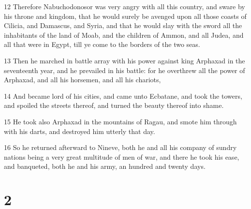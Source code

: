 \par 12 Therefore Nabuchodonosor was very angry with all this country, and sware by his throne and kingdom, that he would surely be avenged upon all those coasts of Cilicia, and Damascus, and Syria, and that he would slay with the sword all the inhabitants of the land of Moab, and the children of Ammon, and all Judea, and all that were in Egypt, till ye come to the borders of the two seas.
\par 13 Then he marched in battle array with his power against king Arphaxad in the seventeenth year, and he prevailed in his battle: for he overthrew all the power of Arphaxad, and all his horsemen, and all his chariots,
\par 14 And became lord of his cities, and came unto Ecbatane, and took the towers, and spoiled the streets thereof, and turned the beauty thereof into shame.
\par 15 He took also Arphaxad in the mountains of Ragau, and smote him through with his darts, and destroyed him utterly that day.
\par 16 So he returned afterward to Nineve, both he and all his company of sundry nations being a very great multitude of men of war, and there he took his ease, and banqueted, both he and his army, an hundred and twenty days.

\chapter{2}

